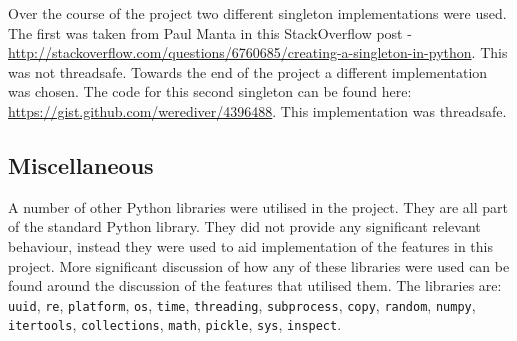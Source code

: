 Over the course of the project two different singleton implementations were used.  The first was taken from Paul Manta in this StackOverflow post - \url{http://stackoverflow.com/questions/6760685/creating-a-singleton-in-python}.  This was not threadsafe.  Towards the end of the project a different implementation was chosen.  The code for this second singleton can be found here: \url{https://gist.github.com/werediver/4396488}.  This implementation was threadsafe.

\subsection{Miscellaneous}
A number of other Python libraries were utilised in the project.  They are all part of the standard Python library.  They did not provide any significant relevant behaviour, instead they were used to aid implementation of the features in this project.  More significant discussion of how any of these libraries were used can be found around the discussion of the features that utilised them.  The libraries are: \texttt{uuid}, \texttt{re}, \texttt{platform}, \texttt{os}, \texttt{time}, \texttt{threading}, \texttt{subprocess}, \texttt{copy}, \texttt{random}, \texttt{numpy}, \texttt{itertools}, \texttt{collections}, \texttt{math}, \texttt{pickle}, \texttt{sys}, \texttt{inspect}.

